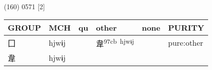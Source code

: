 \documentclass[14pt,a4paper]{scrartcl}
\begin{document}
(160) 0571 {[}2{]}

\begin{longtable}[c]{@{}llllll@{}}
\toprule
\begin{minipage}[b]{0.14\columnwidth}\raggedright\strut
GROUP
\strut\end{minipage} &
\begin{minipage}[b]{0.14\columnwidth}\raggedright\strut
MCH
\strut\end{minipage} &
\begin{minipage}[b]{0.14\columnwidth}\raggedright\strut
qu
\strut\end{minipage} &
\begin{minipage}[b]{0.14\columnwidth}\raggedright\strut
other
\strut\end{minipage} &
\begin{minipage}[b]{0.14\columnwidth}\raggedright\strut
none
\strut\end{minipage} &
\begin{minipage}[b]{0.14\columnwidth}\raggedright\strut
PURITY
\strut\end{minipage}\tabularnewline
\midrule
\endhead
\begin{minipage}[t]{0.14\columnwidth}\raggedright\strut
囗
\strut\end{minipage} &
\begin{minipage}[t]{0.14\columnwidth}\raggedright\strut
hjwɨj
\strut\end{minipage} &
\begin{minipage}[t]{0.14\columnwidth}\raggedright\strut
\strut\end{minipage} &
\begin{minipage}[t]{0.14\columnwidth}\raggedright\strut
韋\textsuperscript{97cb~hjwɨj}
\strut\end{minipage} &
\begin{minipage}[t]{0.14\columnwidth}\raggedright\strut
\strut\end{minipage} &
\begin{minipage}[t]{0.14\columnwidth}\raggedright\strut
pure:other
\strut\end{minipage}\tabularnewline
\begin{minipage}[t]{0.14\columnwidth}\raggedright\strut
韋
\strut\end{minipage} &
\begin{minipage}[t]{0.14\columnwidth}\raggedright\strut
hjwɨj
\strut\end{minipage} &
\begin{minipage}[t]{0.14\columnwidth}\raggedright\strut

\end{minipage}
\end{longtable}
\end{document}
